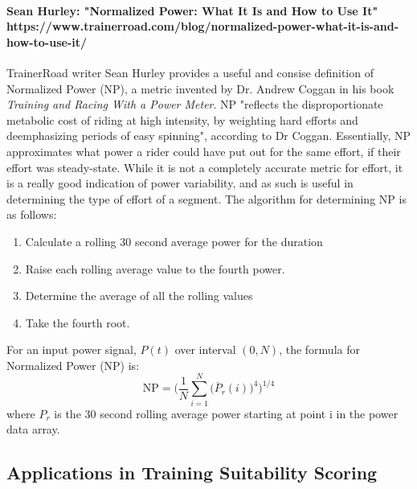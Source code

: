 \documentclass[11pt,a4paper]{report}
\begin{document}
\paragraph{Sean Hurley: "Normalized Power: What It Is and How to Use It" https://www.trainerroad.com/blog/normalized-power-what-it-is-and-how-to-use-it/}
TrainerRoad writer Sean Hurley provides a useful and consise definition of Normalized Power (NP), a metric invented by Dr. Andrew Coggan in his book \textit{Training and Racing With a Power Meter}. NP
"reflects the disproportionate metabolic cost of riding at high intensity, by weighting hard efforts and deemphasizing periods of easy spinning", according to Dr Coggan.
Essentially, NP approximates what power a rider could have put out for the same effort, if their effort was steady-state. While it is not a completely accurate metric for effort, it is a really
good indication of power variability, and as such is useful in determining the type of effort of a segment. The algorithm for determining NP is as follows:
\begin{enumerate}
	\item Calculate a rolling 30 second average power for the duration
	\item Raise each rolling average value to the fourth power.
	\item Determine the average of all the rolling values
	\item Take the fourth root.
\end{enumerate}
For an input power signal, $P(t)$ over interval $(0,N)$, the formula for Normalized Power (NP) is:
\[
	\mathrm{NP} = \bigg( \frac{1}{N} \sum_{i=1}^{N}\big(\overline{P}_{r}(i)\big)^{4}\bigg)^{1/4}
\]
where $P_r$ is the 30 second rolling average power starting at point i in the power data array.
\subsection{Applications in Training Suitability Scoring}
\end{document}
